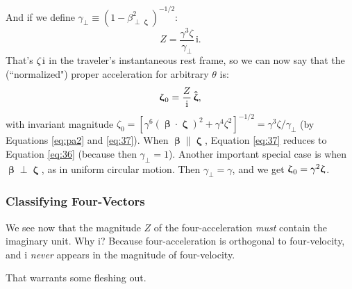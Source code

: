 \documentclass[12pt]{article}
\newcommand{\vvbeta}{\bm{\upbeta}}
\newcommand{\vvzeta}{\bm{\upzeta}}
\newcommand{\hatzeta}{\bm{\hat{\upzeta}}}
\begin{document}
And if we define $\gamma_{\perp} \equiv (1 - \beta_{\perp \vvzeta}^2)^{-1/2}$:
\begin{equation}\label{eq:37}
Z = \frac{\gamma^3 \zeta}{\gamma_{\perp}} \, \mathrm{i}.
\end{equation}
That's $\zeta \mkern1mu \mathrm{i}$ in the traveler's instantaneous rest frame, so we can now say that the (``normalized") proper acceleration for arbitrary $\theta$ is:
\begin{equation}\label{eq:pa4}
\vvzeta_{\mkern1mu 0} = \dfrac{Z}{\mathrm{i}} \, \hatzeta ,
\end{equation}
with invariant magnitude $\zeta_0 = [ \gamma^6 (\vvbeta \cdot \vvzeta)^2 + \gamma^4 \zeta^2 ]^{-1/2} = \gamma^3 \zeta / \gamma_{\perp}$ (by Equations \ref{eq:pa2} and \ref{eq:37}). When $\vvbeta \parallel \vvzeta$, Equation \ref{eq:37} reduces to Equation \ref{eq:36} (because then $\gamma_{\perp} = 1$). Another important special case is when $\vvbeta \perp \vvzeta$, as in uniform circular motion. Then $\gamma_{\perp} = \gamma$, and we get $\vvzeta_{\mkern1mu 0} = \gamma^2 \vvzeta$.


\subsubsection{Classifying Four-Vectors}

We see now that the magnitude $Z$ of the four-acceleration \emph{must} contain the imaginary unit. Why $\mathrm{i}$? Because four-acceleration is orthogonal to four-velocity, and $\mathrm{i}$ \emph{never} appears in the magnitude of four-velocity.

That warrants some fleshing out.
\end{document}
